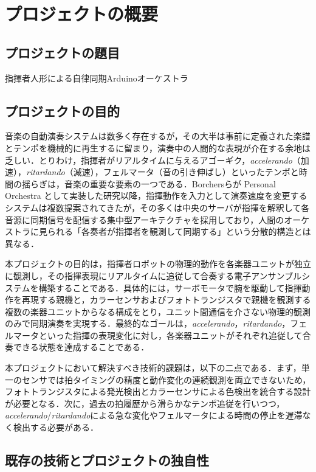 \section{プロジェクトの概要}

\subsection{プロジェクトの題目}
指揮者人形による自律同期Arduinoオーケストラ

\subsection{プロジェクトの目的}

音楽の自動演奏システムは数多く存在するが，その大半は事前に定義された楽譜とテンポを機械的に再生するに留まり，演奏中の人間的な表現が介在する余地は乏しい．とりわけ，指揮者がリアルタイムに与えるアゴーギク，\textit{accelerando}（加速），\textit{ritardando}（減速），フェルマータ（音の引き伸ばし）といったテンポと時間の揺らぎは，音楽の重要な要素の一つである．Borchersらが Personal Orchestra として実装した研究\cite{borchers2004personal}以降，指揮動作を入力として演奏速度を変更するシステムは複数提案されてきたが，その多くは中央のサーバが指揮を解釈して各音源に同期信号を配信する集中型アーキテクチャを採用しており，人間のオーケストラに見られる「各奏者が指揮者を観測して同期する」という分散的構造とは異なる．

本プロジェクトの目的は，指揮者ロボットの物理的動作を各楽器ユニットが独立に観測し，その指揮表現にリアルタイムに追従して合奏する電子アンサンブルシステムを構築することである．具体的には，サーボモータで腕を駆動して指揮動作を再現する親機と，カラーセンサおよびフォトトランジスタで親機を観測する複数の楽器ユニットからなる構成をとり，ユニット間通信を介さない物理的観測のみで同期演奏を実現する．最終的なゴールは，\textit{accelerando}，\textit{ritardando}，フェルマータといった指揮の表現変化に対し，各楽器ユニットがそれぞれ追従して合奏できる状態を達成することである．

本プロジェクトにおいて解決すべき技術的課題は，以下の二点である．まず，単一のセンサでは拍タイミングの精度と動作変化の連続観測を両立できないため，フォトトランジスタによる発光検出とカラーセンサによる色検出を統合する設計が必要となる．次に，過去の拍履歴から滑らかなテンポ追従を行いつつ，\textit{accelerando}/\textit{ritardando}による急な変化やフェルマータによる時間の停止を遅滞なく検出する必要がある．

\subsection{既存の技術とプロジェクトの独自性}

